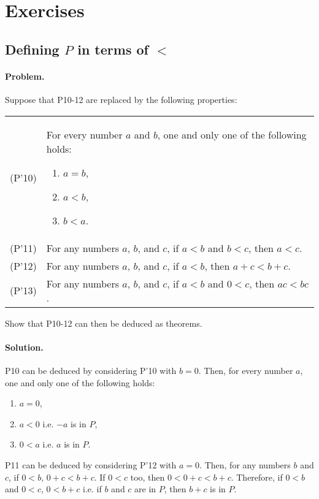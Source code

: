\documentclass{article}
\begin{document}
\section{Exercises}

\setcounter{subsection}{7}
\subsection{Defining $P$ in terms of $<$}

\paragraph{Problem.} Suppose that P10-12 are replaced by the following properties:

\begin{tabular}{l p{4in}}
  (P'10) & For every number $a$ and $b$, one and only one of the following holds: \begin{enumerate}
      \itemsep0em
      \item $a = b$,
      \item $a < b$,
      \item $b < a$. \label{p'10}
    \end{enumerate} \\
  (P'11) & For any numbers $a$, $b$, and $c$, if $a < b$ and $b < c$, then $a < c$. \label{p'11} \\
  (P'12) & For any numbers $a$, $b$, and $c$, if $a < b$, then $a + c < b + c$. \label{p'12} \\
  (P'13) & For any numbers $a$, $b$, and $c$, if $a < b$ and $0 < c$, then $ac < bc$. \label{p'13} \\
\end{tabular}

Show that P10-12 can then be deduced as theorems.

\paragraph{Solution.} P10 can be deduced by considering P'10 with $b = 0$. Then, for every number $a$, one and only one of the following holds: \begin{enumerate}
    \itemsep0em
    \item $a = 0$,
    \item $a < 0$ i.e. $-a$ is in $P$,
    \item $0 < a$ i.e. $a$ is in $P$.
\end{enumerate}

P11 can be deduced by considering P'12 with $a = 0$. Then, for any numbers $b$ and $c$, if $0 < b$, $0 + c < b + c$. If $0 < c$ too, then $0 < 0 + c < b + c$. Therefore, if $0 < b$ and $0 < c$, $0 < b + c$ i.e. if $b$ and $c$ are in $P$, then $b + c$ is in $P$.
\end{document}
